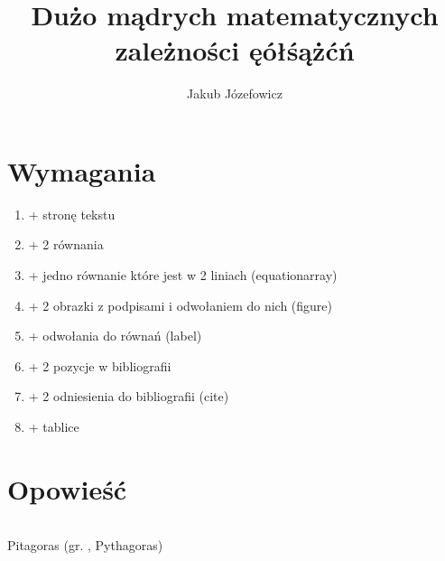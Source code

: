 \documentclass[11pt]{article}
\title{Dużo mądrych matematycznych zależności ęółśążćń}
\author{Jakub Józefowicz}
\begin{document}
\maketitle

\newpage
\part{Wymagania}
\begin{enumerate}
\item + stronę tekstu
\item + 2 równania
\item + jedno równanie które jest w 2 liniach (equationarray)
\item + 2 obrazki z podpisami i odwołaniem do nich (figure) 
\item + odwołania do równań (label)
\item + 2 pozycje w bibliografii
\item + 2 odniesienia do bibliografii (cite)
\item + tablice 
\end{enumerate}

\newpage
\part{Opowieść}
\paragraph{}
Pitagoras (gr. \Pi \upsilon \Theta \alpha\gamma\phi\rho\alpha\varsigma, Pythagoras) \\
\end{document}
